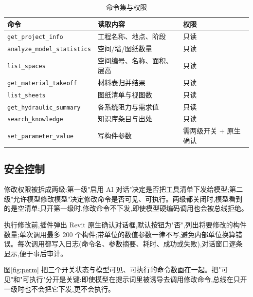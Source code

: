 \documentclass[UTF8,a4paper,zihao=-4]{ctexart}
\begin{document}
\begin{table}[H]
\centering
\caption{命令集与权限}\label{tab:cmds}
\small
\begin{tabular}{p{5.0cm}p{3.9cm}p{5.3cm}}
\toprule
命令 & 读取内容 & 权限 \\
\midrule
\texttt{get\_project\_info} & 工程名称、地点、阶段 & 只读 \\
\texttt{analyze\_model\_statistics} & 空间/墙/图纸数量 & 只读 \\
\texttt{list\_spaces} & 空间编号、名称、面积、层高 & 只读 \\
\texttt{get\_material\_takeoff} & 材料表归并结果 & 只读 \\
\texttt{list\_sheets} & 图纸清单与视图数 & 只读 \\
\texttt{get\_hydraulic\_summary} & 各系统阻力与需求值 & 只读 \\
\texttt{search\_knowledge} & 知识库条目与出处 & 只读 \\
\texttt{set\_parameter\_value} & 写构件参数 & 需两级开关 + 原生确认 \\
\bottomrule
\end{tabular}
\end{table}

\subsection{安全控制}

修改权限被拆成两级:第一级"启用 AI 对话"决定是否把工具清单下发给模型;第二级"允许模型修改模型"决定修改命令是否可见、可执行。两级都关闭时,模型看到的是空清单;只开第一级时,修改命令不下发,即使模型硬编码调用也会被总线拒绝。

执行修改前,插件弹出 Revit 原生确认对话框,默认按钮为"否",列出将要修改的构件数量;单次调用最多 200 个构件;带单位的数值参数一律不写,避免内部单位换算错误。每次调用都写入日志(命令名、参数摘要、耗时、成功或失败),对话窗口逐条显示,便于事后审计。

图\ref{fig:perm} 把三个开关状态与模型可见、可执行的命令数画在一起。把"可见"和"可执行"分开是关键:即使模型在提示词里被诱导去调用修改命令,总线在只开一级时也不会把它下发,更不会执行。
\end{document}
